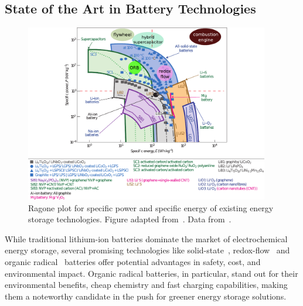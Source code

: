 \subsection{State of the Art in Battery Technologies}
\begin{figure}[h]
\center
	\includegraphics[width=0.95\textwidth]{./introduction/figures/ragone.pdf}
	\caption{Ragone plot for specific power and specific energy of existing energy storage technologies. Figure adapted from~\cite{Kato2016}. Data from~\cite{Kato2016,Feng_2010,Zuo2017,Chen2017,Reddy_book,ragone}.}
	\label{fig:ragone}
\end{figure}

While traditional lithium-ion batteries dominate the market of electrochemical energy storage, several promising technologies like solid-state~\cite{Kato2016}, redox-flow~\cite{Janoschka2017} and organic radical~\cite{IWASA2007} batteries offer potential advantages in safety, cost, and environmental impact. Organic radical batteries, in particular, stand out for their environmental benefits, cheap chemistry and fast charging capabilities, making them a noteworthy candidate in the push for greener energy storage solutions.


